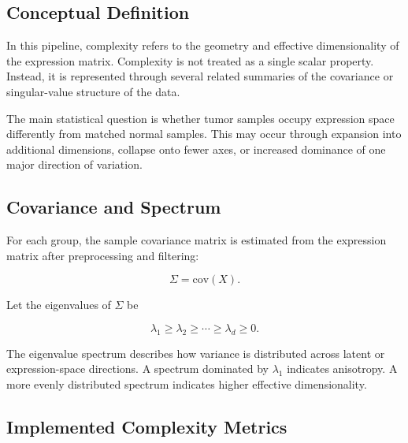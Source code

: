 \documentclass[
  letterpaper,
  DIV=11,
  numbers=noendperiod,
  openany,
  oneside]{scrreprt}
\begin{document}
\subsection{Conceptual Definition}\label{conceptual-definition}

In this pipeline, complexity refers to the geometry and effective
dimensionality of the expression matrix. Complexity is not treated as a
single scalar property. Instead, it is represented through several
related summaries of the covariance or singular-value structure of the
data.

The main statistical question is whether tumor samples occupy expression
space differently from matched normal samples. This may occur through
expansion into additional dimensions, collapse onto fewer axes, or
increased dominance of one major direction of variation.

\subsection{Covariance and Spectrum}\label{covariance-and-spectrum}

For each group, the sample covariance matrix is estimated from the
expression matrix after preprocessing and filtering:

\[
\Sigma = \mathrm{cov}(X).
\]

Let the eigenvalues of \(\Sigma\) be

\[
\lambda_1 \geq \lambda_2 \geq \cdots \geq \lambda_d \geq 0.
\]

The eigenvalue spectrum describes how variance is distributed across
latent or expression-space directions. A spectrum dominated by
\(\lambda_1\) indicates anisotropy. A more evenly distributed spectrum
indicates higher effective dimensionality.

\subsection{Implemented Complexity
Metrics}\label{implemented-complexity-metrics}
\end{document}
